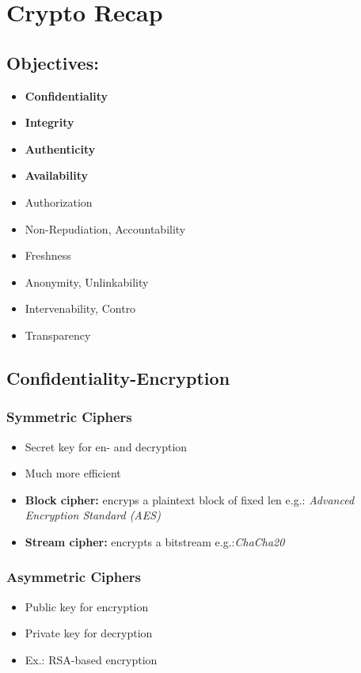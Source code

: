 \section{Crypto Recap}
\subsection{Objectives:}
\begin{itemize}
  \item{\textbf{Confidentiality}}
  \item{\textbf{Integrity}}
  \item{\textbf{Authenticity}}
  \item{\textbf{Availability}}
  \item{Authorization}
  \item{Non-Repudiation, Accountability}
  \item{Freshness}
  \item{Anonymity, Unlinkability}
  \item{Intervenability, Contro}
  \item{Transparency}
\end{itemize}

\subsection{Confidentiality-Encryption}
\subsubsection{Symmetric Ciphers}
\begin{itemize}
  \item Secret key for en- and decryption
  \item Much more efficient
  \item \textbf{Block cipher: }encryps a plaintext block of fixed len e.g.: \textit{Advanced Encryption Standard (AES)}
  \item \textbf{Stream cipher: }encrypts a bitstream e.g.:\textit{ChaCha20}
\end{itemize}

\subsubsection{Asymmetric Ciphers}
\begin{itemize}
  \item Public key for encryption
  \item Private key for decryption
  \item Ex.: RSA-based encryption
\end{itemize}

